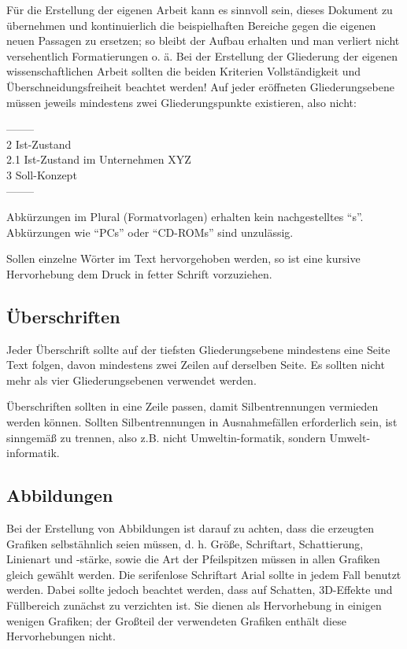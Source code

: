 \documentclass[11pt]{scrartcl}
\begin{document}
Für die Erstellung der eigenen Arbeit kann es sinnvoll sein, dieses Dokument zu übernehmen  und kontinuierlich die beispielhaften Bereiche gegen die eigenen neuen Passagen zu ersetzen; so bleibt der Aufbau erhalten und man verliert nicht versehentlich Formatierungen o. ä. Bei der Erstellung der Gliederung der eigenen wissenschaftlichen Arbeit sollten die beiden Kriterien Vollständigkeit und Überschneidungsfreiheit beachtet werden! Auf jeder eröffneten Gliederungsebene müssen jeweils mindestens zwei Gliederungspunkte existieren, also nicht:

\noindent--------\\
2	Ist-Zustand\\
2.1	Ist-Zustand im Unternehmen XYZ\\
3	Soll-Konzept\\
--------

Abkürzungen im Plural (Formatvorlagen) erhalten kein nachgestelltes "`s"'. Abkürzungen wie "`PCs"' oder "`CD-ROMs"' sind unzulässig.

Sollen einzelne Wörter im Text hervorgehoben werden, so ist eine kursive Hervorhebung dem Druck in fetter Schrift  vorzuziehen.

\subsection{Überschriften}
Jeder Überschrift sollte auf der tiefsten Gliederungsebene mindestens eine Seite Text folgen, davon mindestens zwei Zeilen auf derselben Seite. Es sollten nicht mehr als vier Gliederungsebenen verwendet werden. 

Überschriften sollten in eine Zeile passen, damit Silbentrennungen vermieden werden können. Sollten Silbentrennungen in Ausnahmefällen erforderlich sein, ist sinngemäß zu trennen, also z.B. nicht Umweltin-formatik, sondern Umwelt-informatik.


\subsection{Abbildungen}
Bei der Erstellung von Abbildungen ist darauf zu achten, dass die erzeugten Grafiken selbstähnlich seien müssen, d. h. Größe, Schriftart, Schattierung, Linienart und -stärke, sowie die Art der Pfeilspitzen müssen in allen Grafiken gleich gewählt werden. Die serifenlose Schriftart Arial sollte in jedem Fall benutzt werden. Dabei sollte jedoch beachtet werden, dass auf Schatten, 3D-Effekte  und Füllbereich zunächst zu verzichten ist. Sie dienen als Hervorhebung in einigen wenigen Grafiken; der Großteil der verwendeten Grafiken enthält diese Hervorhebungen nicht.
\end{document}
